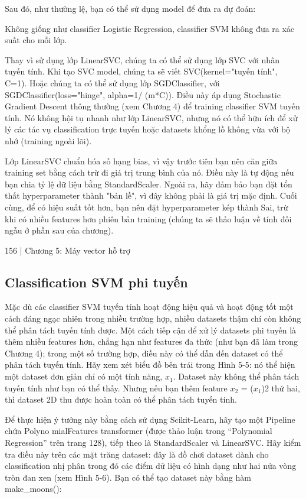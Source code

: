 Sau đó, như thường lệ, bạn có thể sử dụng model để đưa ra dự đoán:

Không giống như classifier Logistic Regression, classifier SVM không đưa ra xác suất cho mỗi lớp.

Thay vì sử dụng lớp LinearSVC, chúng ta có thể sử dụng lớp SVC với nhân tuyến tính. Khi tạo SVC model, chúng ta sẽ viết SVC(kernel="tuyến tính", C=1). Hoặc chúng ta có thể sử dụng lớp SGDClassifier, với SGDClassifier(loss="hinge", alpha=1/ (m*C)). Điều này áp dụng Stochastic Gradient Descent thông thường (xem Chương 4) để training classifier SVM tuyến tính. Nó không hội tụ nhanh như lớp LinearSVC, nhưng nó có thể hữu ích để xử lý các tác vụ classification trực tuyến hoặc datasets khổng lồ không vừa với bộ nhớ (training ngoài lõi).

Lớp LinearSVC chuẩn hóa số hạng bias, vì vậy trước tiên bạn nên căn giữa training set bằng cách trừ đi giá trị trung bình của nó. Điều này là tự động nếu bạn chia tỷ lệ dữ liệu bằng StandardScaler. Ngoài ra, hãy đảm bảo bạn đặt tổn thất hyperparameter thành "bản lề", vì đây không phải là giá trị mặc định. Cuối cùng, để có hiệu suất tốt hơn, bạn nên đặt hyperparameter kép thành Sai, trừ khi có nhiều features hơn phiên bản training (chúng ta sẽ thảo luận về tính đối ngẫu ở phần sau của chương).

156 | Chương 5: Máy vector hỗ trợ

\subsection{Classification SVM phi tuyến}

Mặc dù các classifier SVM tuyến tính hoạt động hiệu quả và hoạt động tốt một cách đáng ngạc nhiên trong nhiều trường hợp, nhiều datasets thậm chí còn không thể phân tách tuyến tính được. Một cách tiếp cận để xử lý datasets phi tuyến là thêm nhiều features hơn, chẳng hạn như features đa thức (như bạn đã làm trong Chương 4); trong một số trường hợp, điều này có thể dẫn đến dataset có thể phân tách tuyến tính. Hãy xem xét biểu đồ bên trái trong Hình 5-5: nó thể hiện một dataset đơn giản chỉ có một tính năng, $x_{1}$. Dataset này không thể phân tách tuyến tính như bạn có thể thấy. Nhưng nếu bạn thêm feature $x_{2}$ = ($x_{1}$)2 thứ hai, thì dataset 2D thu được hoàn toàn có thể phân tách tuyến tính.

Để thực hiện ý tưởng này bằng cách sử dụng Scikit-Learn, hãy tạo một Pipeline chứa Polyno mialFeatures transformer (được thảo luận trong “Polynomial Regression” trên trang 128), tiếp theo là StandardScaler và LinearSVC. Hãy kiểm tra điều này trên các mặt trăng dataset: đây là đồ chơi dataset dành cho classification nhị phân trong đó các điểm dữ liệu có hình dạng như hai nửa vòng tròn đan xen (xem Hình 5-6). Bạn có thể tạo dataset này bằng hàm make\_moons():

